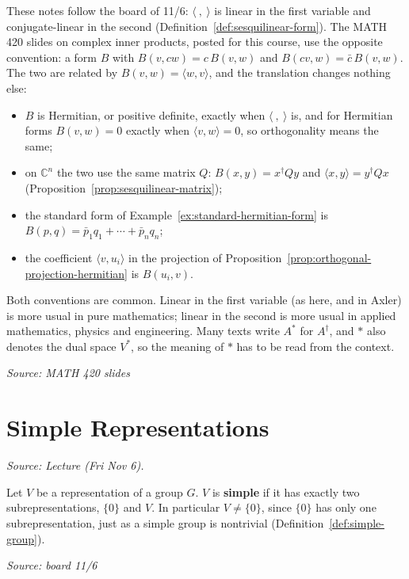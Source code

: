 \documentclass[11pt]{report}
\newcommand{\srcline}[1]{\par\hfill{\footnotesize\textit{Source: #1}}}
\begin{document}
\begin{rembox}\label{rem:sesquilinear-conventions}
These notes follow the board of 11/6: $\langle\ ,\ \rangle$ is linear in the first variable and conjugate-linear in the second (Definition~\ref{def:sesquilinear-form}). The MATH 420 slides on complex inner products, posted for this course, use the opposite convention: a form $B$ with $B(v, cw) = c\,B(v, w)$ and $B(cv, w) = \bar c\,B(v, w)$. The two are related by $B(v, w) = \langle w, v \rangle$, and the translation changes nothing else:
\begin{itemize}[nosep]
    \item $B$ is Hermitian, or positive definite, exactly when $\langle\ ,\ \rangle$ is, and for Hermitian forms $B(v, w) = 0$ exactly when $\langle v, w \rangle = 0$, so orthogonality means the same;
    \item on $\mathbb{C}^n$ the two use the same matrix $Q$: $B(x, y) = x^\dagger Q y$ and $\langle x, y \rangle = y^\dagger Q x$ (Proposition~\ref{prop:sesquilinear-matrix});
    \item the standard form of Example~\ref{ex:standard-hermitian-form} is $B(p, q) = \bar p_1 q_1 + \cdots + \bar p_n q_n$;
    \item the coefficient $\langle v, u_i \rangle$ in the projection of Proposition~\ref{prop:orthogonal-projection-hermitian} is $B(u_i, v)$.
\end{itemize}
Both conventions are common. Linear in the first variable (as here, and in Axler) is more usual in pure mathematics; linear in the second is more usual in applied mathematics, physics and engineering. Many texts write $A^\ast$ for $A^\dagger$, and $\ast$ also denotes the dual space $V^\ast$, so the meaning of $\ast$ has to be read from the context.
\srcline{MATH 420 slides}
\end{rembox}

\section{Simple Representations}\label{sec:simple-representations}

\textit{Source: Lecture (Fri Nov 6).}

\begin{defbox}\label{def:simple-representation}
Let $V$ be a representation of a group $G$. $V$ is \textbf{simple} if it has exactly two subrepresentations, $\{0\}$ and $V$.
In particular $V \neq \{0\}$, since $\{0\}$ has only one subrepresentation, just as a simple group is nontrivial (Definition~\ref{def:simple-group}).
\srcline{board 11/6}
\end{defbox}
\end{document}
